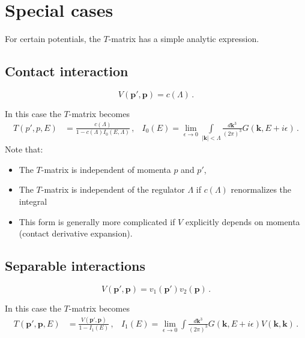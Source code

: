 \documentclass[
    aps,
    prl,
    showkeys,
    nofootinbib,
    floatfix
]{revtex4}
\renewcommand{\vec}[1]{\boldsymbol{#1}}
\begin{document}
\section{Special cases}

For certain potentials, the $T$-matrix has a simple analytic expression.

\subsection{Contact interaction}
\begin{equation}
	V(\vec p', \vec p) = c(\Lambda) \, .
\end{equation}

In this case the $T$-matrix becomes
\begin{align}\label{eq:quantization-contact-physical}
	T(p', p, E) &= \frac{c(\Lambda)}{1 - c(\Lambda) I_0(E, \Lambda)} \, , &
	I_0(E) = \lim\limits_{\epsilon \to 0} \int\limits_{|\vec k| < \Lambda} \frac{d \vec k^3}{(2\pi)^3} G(\vec k, E + i \epsilon)
	\, .
\end{align}
Note that:
\begin{itemize}
	\item The $T$-matrix is independent of momenta $p$ and $p'$,
	\item The $T$-matrix is independent of the regulator $\Lambda$ if $c(\Lambda)$ renormalizes the integral
	\item This form is generally more complicated if $V$ explicitly depends on momenta (contact derivative expansion).
\end{itemize}

\subsection{Separable interactions}
\begin{equation}
	V(\vec p', \vec p) = v_1(\vec p') v_2(\vec p) \, .
\end{equation}

In this case the $T$-matrix becomes
\begin{align}\label{eq:quantization-separable-physical}
	T(\vec p', \vec p, E) &= \frac{V(\vec p', \vec p)}{1 - I_1(E)} \, , &
	I_1(E) = \lim\limits_{\epsilon \to 0} \int \frac{d \vec k^3}{(2\pi)^3} G(\vec k, E + i \epsilon) V(\vec k, \vec k)
	\, .
\end{align}
\end{document}
